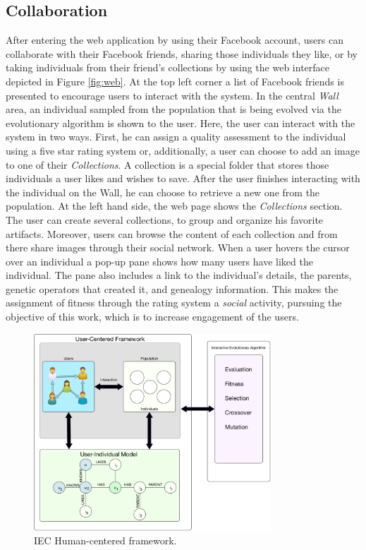 \documentclass[conference]{IEEEtran}
\begin{document}
\subsection{Collaboration}
\label{sec:col}
After entering the web application by using their Facebook account,
users can collaborate with their Facebook friends, 
sharing those individuals they like, or by taking individuals
from their friend's collections by using the web interface depicted 
in Figure \ref{fig:web}.
At the top left corner a list of Facebook friends is presented
to encourage users to interact with the system. In the central 
\emph{ Wall } area, an individual sampled from the population that is
being evolved via the evolutionary algorithm 
is shown to the user.
Here, the user can interact with the system in two ways.
First, he can assign a quality assessment to the individual using
a five star rating system or,
additionally, a user can choose to add an image to one of their \emph{Collections}.
A collection is a special folder that stores those individuals a user likes and wishes
to save. After the user finishes interacting with the individual
on the Wall, he can choose to retrieve a new one from the population.
At the left hand side, the web page shows the \emph{Collections} section.
The user can create several collections, to group and organize his favorite 
artifacts. Moreover, users can browse the content of each collection and from
there share images through their social network.
When a user hovers the cursor over an individual a pop-up pane shows how many users have
liked the individual. The pane also includes a link to the individual's 
details, the parents, genetic operators that created it, and genealogy
information. This makes the assignment of fitness through the rating
system a {\em social} activity, pursuing the objective of this work,
which is to increase engagement of the users. %

\begin{figure}[!t]
    \centering
        \includegraphics[width=3.5in]{img/framework.png}
    \caption{IEC Human-centered framework.}
    \label{fig:uc_framework}
\end{figure}
\end{document}

